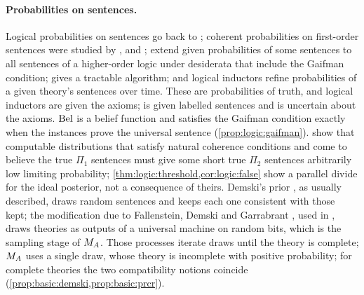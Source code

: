 \paragraph{Probabilities on sentences.}
Logical probabilities on sentences go back to \citet{carnap1950logical}; coherent probabilities on first-order sentences were studied by \citet{gaifman1964concerning}, \citet{scott1966assigning} and \citet{gaifman1982probabilities}; \citet{hutter2013probabilities} extend given probabilities of some sentences to all sentences of a higher-order logic under desiderata that include the Gaifman condition; \citet{christiano2014nonomniscience} gives a tractable algorithm; and logical inductors \citep{garrabrant2016logical} refine probabilities of a given theory's sentences over time. These are probabilities of truth, and logical inductors are given the axioms; \SAIabbr is given labelled sentences and is uncertain about the axioms. $\mathrm{Bel}$ is a belief function \citep{dempster1967upper,shafer1976mathematical} and satisfies the Gaifman condition exactly when the instances prove the universal sentence (\cref{prop:logic:gaifman}). \citet{sawin2013computable} show that computable distributions that satisfy natural coherence conditions and come to believe the true $\Pi_1$ sentences must give some short true $\Pi_2$ sentences arbitrarily low limiting probability; \cref{thm:logic:threshold,cor:logic:false} show a parallel divide for the ideal \SAIabbr posterior, not a consequence of theirs. Demski's prior \citep{demski2012logical}, as usually described, draws random sentences and keeps each one consistent with those kept; the modification due to Fallenstein, Demski and Garrabrant \citep{garrabrant2015modification}, used in \citet{garrabrant2016inductive}, draws theories as outputs of a universal machine on random bits, which is the sampling stage of $M_{A}$. Those processes iterate draws until the theory is complete; $M_{A}$ uses a single draw, whose theory is incomplete with positive probability; for complete theories the two compatibility notions coincide (\cref{prop:basic:demski,prop:basic:prcr}).

